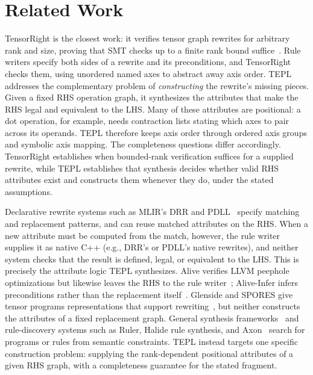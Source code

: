 \section{Related Work}
\label{sec:related-work}

TensorRight is the closest work: it verifies tensor graph rewrites for
arbitrary rank and size, proving that SMT checks up to a finite rank bound
suffice~\cite{tensorright}. Rule writers specify both sides of a rewrite and
its preconditions, and TensorRight checks them, using unordered named axes to
abstract away axis order. TEPL addresses the complementary problem of
\emph{constructing} the rewrite's missing pieces. Given a fixed RHS operation
graph, it synthesizes the attributes that make the RHS legal and equivalent
to the LHS. Many of these attributes are positional: a dot operation, for
example, needs contraction lists stating which axes to pair across its
operands. TEPL therefore keeps axis order through ordered axis groups and
symbolic axis mapping. The completeness questions differ accordingly.
TensorRight establishes when bounded-rank verification suffices for a
supplied rewrite, while TEPL establishes that synthesis decides whether valid
RHS attributes exist and constructs them whenever they do, under the stated
assumptions.

Declarative rewrite systems such as MLIR's DRR and
PDLL~\cite{mlir-drr,mlir-pdll} specify matching and replacement patterns, and
can reuse matched attributes on the RHS. When a new attribute must be computed
from the match, however, the rule writer supplies it as native C++ (e.g.,
DRR's  or PDLL's native rewrites), and neither system
checks that the result is defined, legal, or equivalent to the LHS. This is
precisely the attribute logic TEPL synthesizes. Alive verifies LLVM peephole
optimizations but likewise leaves the RHS to the rule writer~\cite{alive};
Alive-Infer infers preconditions rather than the replacement
itself~\cite{alive-infer}. Glenside and SPORES give tensor programs
representations that support rewriting~\cite{glenside,spores}, but neither
constructs the attributes of a fixed replacement graph. General synthesis
frameworks~\cite{sketch,sygus,loop-free-synthesis} and rule-discovery systems
such as Ruler, Halide rule synthesis, and Axon~\cite{ruler,halide-rules,axon}
search for programs or rules from semantic constraints. TEPL instead targets
one specific construction problem: supplying the rank-dependent positional
attributes of a given RHS graph, with a completeness guarantee for the stated
fragment.
